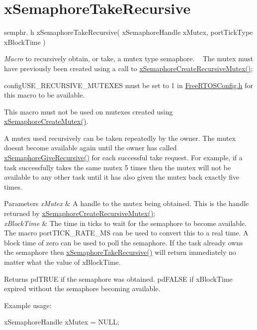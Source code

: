\hypertarget{group__x_semaphore_take_recursive}{}\section{x\+Semaphore\+Take\+Recursive}
\label{group__x_semaphore_take_recursive}
semphr. h x\+Semaphore\+Take\+Recursive( x\+Semaphore\+Handle x\+Mutex, port\+Tick\+Type x\+Block\+Time )

{\itshape Macro} to recursively obtain, or \textquotesingle{}take\textquotesingle{}, a mutex type semaphore. ~\newline
 The mutex must have previously been created using a call to \mbox{\hyperlink{semphr_8h_a1bbc843be5a41ea83d2693b2189fc0f8}{x\+Semaphore\+Create\+Recursive\+Mutex()}};

config\+U\+S\+E\+\_\+\+R\+E\+C\+U\+R\+S\+I\+V\+E\+\_\+\+M\+U\+T\+E\+X\+ES must be set to 1 in \mbox{\hyperlink{_free_r_t_o_s_config_8h}{Free\+R\+T\+O\+S\+Config.\+h}} for this macro to be available.

This macro must not be used on mutexes created using \mbox{\hyperlink{semphr_8h_aa6a00aa9b91a9e5b3ebe4ae1c3f115c6}{x\+Semaphore\+Create\+Mutex()}}.

A mutex used recursively can be \textquotesingle{}taken\textquotesingle{} repeatedly by the owner. The mutex doesn\textquotesingle{}t become available again until the owner has called \mbox{\hyperlink{semphr_8h_a398d66b17856c22dd49d39aaac42f105}{x\+Semaphore\+Give\+Recursive()}} for each successful \textquotesingle{}take\textquotesingle{} request. For example, if a task successfully \textquotesingle{}takes\textquotesingle{} the same mutex 5 times then the mutex will not be available to any other task until it has also \textquotesingle{}given\textquotesingle{} the mutex back exactly five times.


\begin{DoxyParams}{Parameters}
{\em x\+Mutex} & A handle to the mutex being obtained. This is the handle returned by \mbox{\hyperlink{semphr_8h_a1bbc843be5a41ea83d2693b2189fc0f8}{x\+Semaphore\+Create\+Recursive\+Mutex()}};\\
\hline
{\em x\+Block\+Time} & The time in ticks to wait for the semaphore to become available. The macro port\+T\+I\+C\+K\+\_\+\+R\+A\+T\+E\+\_\+\+MS can be used to convert this to a real time. A block time of zero can be used to poll the semaphore. If the task already owns the semaphore then \mbox{\hyperlink{semphr_8h_ad395f4bba51eea6af3397d72bc079e4d}{x\+Semaphore\+Take\+Recursive()}} will return immediately no matter what the value of x\+Block\+Time.\\
\hline
\end{DoxyParams}
\begin{DoxyReturn}{Returns}
pd\+T\+R\+UE if the semaphore was obtained. pd\+F\+A\+L\+SE if x\+Block\+Time expired without the semaphore becoming available.
\end{DoxyReturn}
Example usage\+: 
\begin{DoxyPre}
xSemaphoreHandle xMutex = NULL;\end{DoxyPre}



